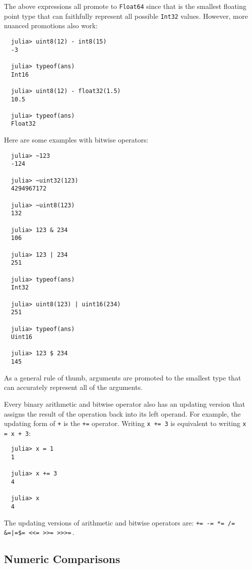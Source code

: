 \documentclass{article}
\renewcommand{\sec}[1]{\label{sec:#1}}
\begin{document}
The above expressions all promote to \verb|Float64| since that is the smallest floating point type that can faithfully represent all possible \verb|Int32| values.
However, more nuanced promotions also work:
\begin{verbatim}
  julia> uint8(12) - int8(15)
  -3

  julia> typeof(ans)
  Int16

  julia> uint8(12) - float32(1.5)
  10.5

  julia> typeof(ans)
  Float32
\end{verbatim}
Here are some examples with bitwise operators:
\begin{verbatim}
  julia> ~123
  -124

  julia> ~uint32(123)
  4294967172

  julia> ~uint8(123)
  132

  julia> 123 & 234
  106

  julia> 123 | 234
  251

  julia> typeof(ans)
  Int32

  julia> uint8(123) | uint16(234)
  251

  julia> typeof(ans)
  Uint16

  julia> 123 $ 234
  145
\end{verbatim}
As a general rule of thumb, arguments are promoted to the smallest type that can accurately represent all of the arguments.

Every binary arithmetic and bitwise operator also has an updating version that assigns the result of the operation back into its left operand.
For example, the updating form of \verb|+| is the \verb|+=| operator.
Writing \verb|x += 3| is equivalent to writing \verb|x = x + 3|:
\begin{verbatim}
  julia> x = 1
  1

  julia> x += 3
  4

  julia> x
  4
\end{verbatim}
The updating versions of arithmetic and bitwise operators are:
\verb|+= -= *= /= &=|\hspace{1.3ex}\texttt{|=}\hspace{1.3ex}\verb|$= <<= >>= >>>=|\,.

\subsection{Numeric Comparisons}\sec{numeric-comparisons}
\end{document}
